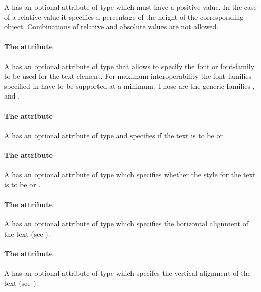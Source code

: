 A \Text has an optional attribute  of type \RelAbsVector which 
must have a positive value. In the case of a relative value it specifies a 
percentage of the height of the corresponding object. Combinations of relative 
and absolute values are not allowed.


\paragraph{The \fixttspace{} attribute}

A \Text has an optional attribute  of type
 that allows to specify the font or font-family to be used for 
the text element. For maximum interoperability the font families specified in 
\FontFamily have to be supported at a minimum. Those are the generic families 
,  and .

\paragraph{The \fixttspace{} attribute}

A \Text has an optional attribute  of type
\FontWeight and specifies if the text is to be  or .

\paragraph{The \fixttspace{} attribute}

A \Text has an optional attribute  of type \FontStyle which 
specifies whether the style for the text is to be  or .

\paragraph{The \fixttspace{} attribute}

A \Text has an optional attribute  of type
\HTextAnchor which specifies the horizontal alignment of the text (see ).

\paragraph{The \fixttspace{} attribute}

A \Text has an optional attribute  of type
\VTextAnchor which specifes the vertical alignment of the text (see ).

